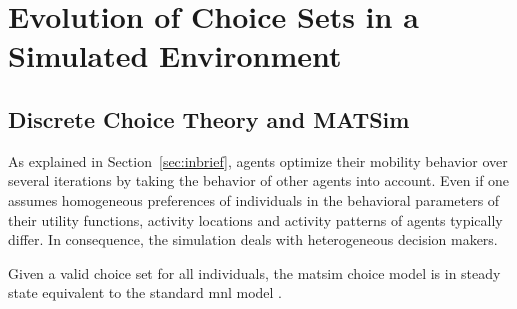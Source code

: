 \section{\label{sec:Evolution-of-choice}Evolution of Choice Sets in a Simulated
Environment}

\begin{oframed}
%
%
\subsection{Discrete Choice Theory and MATSim}
\label{ch:economicEval:describingBehavior:discreteChoice:matsim}
%
As explained in Section~\ref{sec:inbrief},
%
%
agents optimize their mobility behavior over several iterations by taking the behavior of other agents into account. Even if one assumes homogeneous preferences of individuals in the behavioral parameters of their utility functions, activity locations and activity patterns of agents typically differ. In consequence, the simulation deals with heterogeneous decision makers.

Given a valid choice set for all individuals, the \acrshort{matsim} choice model is in steady state equivalent to the standard \gls{mnl} model \citep{NagelFloetteroed2009IatbrResourceInBook}.


\end{oframed}
